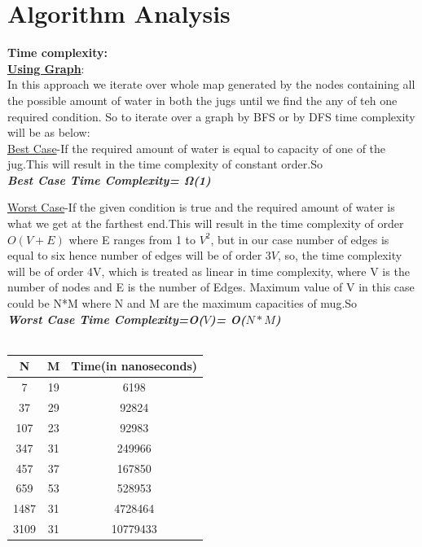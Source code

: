 \documentclass[conference]{IEEEtran}
\begin{document}
\section{Algorithm Analysis}
\textbf{Time complexity:}\\

\textbf{\underline{Using  Graph}}:\\
In this  approach we iterate over whole map generated by the nodes containing all the possible amount of water in both the jugs until we find the any of teh one required condition. So to iterate over a graph by BFS or by DFS time complexity will be as below:\\

\underline{Best Case}-If the required amount of water is equal to capacity of one of the jug.This will result in the time complexity of constant order.So\\ \textit{\textbf{Best Case Time Complexity= \si{\ohm}(1)}}

\underline{Worst Case}-If the given condition is true and the required amount of water is what we get at the farthest end.This will result in the time complexity of order $O(V+E)$ where E ranges from 1 to $V^{2}$, but in our case number of edges is equal to six hence number of edges will be of order $3V$, so, the time complexity will be of order 4V, which is treated as linear in time complexity, where V is the number of nodes and E is the number of Edges. Maximum value of V in this case could be N*M where N and M are the maximum capacities of mug.So \\\textit{\textbf{Worst Case Time Complexity=O($V$)= O($N*M$)}}\\\\


 \begin{center}
 \begin{tabular}{||c| c| c||} 
 \hline
 N & M & Time(in nanoseconds) \\ [0.5ex] 
 \hline\hline
 7 & 19 & 6198  \\ 
 \hline
 37 & 29 & 92824  \\ 
 \hline
 107 & 23 & 92983 \\ 
 \hline
 347 & 31 & 249966  \\ 
 \hline
 457 & 37 & 167850  \\ 
 \hline
 659 & 53 & 528953  \\ 
 \hline
 1487 & 31 & 4728464  \\ 
 \hline
 3109 & 31 & 10779433  \\ [1ex] 
  \hline
\end{tabular}
\end{center}
\end{document}
